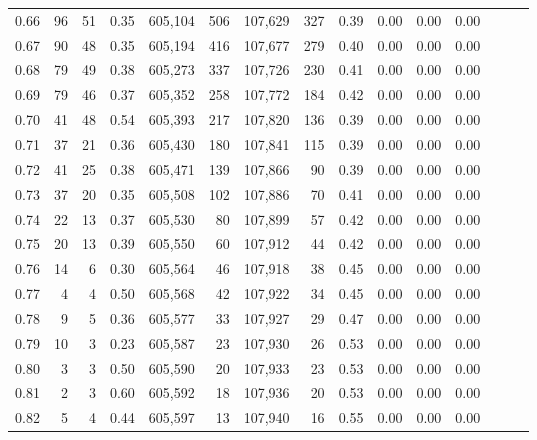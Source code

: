 \begin{tabular}{rrrrrrrrrrrrrrr}
0.66 &      96 &     51 &  0.35 &  605,104 &      506 &  107,629 &      327 &  0.39 &  0.00 &  0.00 &      0.00 \\
0.67 &      90 &     48 &  0.35 &  605,194 &      416 &  107,677 &      279 &  0.40 &  0.00 &  0.00 &      0.00 \\
0.68 &      79 &     49 &  0.38 &  605,273 &      337 &  107,726 &      230 &  0.41 &  0.00 &  0.00 &      0.00 \\
0.69 &      79 &     46 &  0.37 &  605,352 &      258 &  107,772 &      184 &  0.42 &  0.00 &  0.00 &      0.00 \\
0.70 &      41 &     48 &  0.54 &  605,393 &      217 &  107,820 &      136 &  0.39 &  0.00 &  0.00 &      0.00 \\
0.71 &      37 &     21 &  0.36 &  605,430 &      180 &  107,841 &      115 &  0.39 &  0.00 &  0.00 &      0.00 \\
0.72 &      41 &     25 &  0.38 &  605,471 &      139 &  107,866 &       90 &  0.39 &  0.00 &  0.00 &      0.00 \\
0.73 &      37 &     20 &  0.35 &  605,508 &      102 &  107,886 &       70 &  0.41 &  0.00 &  0.00 &      0.00 \\
0.74 &      22 &     13 &  0.37 &  605,530 &       80 &  107,899 &       57 &  0.42 &  0.00 &  0.00 &      0.00 \\
0.75 &      20 &     13 &  0.39 &  605,550 &       60 &  107,912 &       44 &  0.42 &  0.00 &  0.00 &      0.00 \\
0.76 &      14 &      6 &  0.30 &  605,564 &       46 &  107,918 &       38 &  0.45 &  0.00 &  0.00 &      0.00 \\
0.77 &       4 &      4 &  0.50 &  605,568 &       42 &  107,922 &       34 &  0.45 &  0.00 &  0.00 &      0.00 \\
0.78 &       9 &      5 &  0.36 &  605,577 &       33 &  107,927 &       29 &  0.47 &  0.00 &  0.00 &      0.00 \\
0.79 &      10 &      3 &  0.23 &  605,587 &       23 &  107,930 &       26 &  0.53 &  0.00 &  0.00 &      0.00 \\
0.80 &       3 &      3 &  0.50 &  605,590 &       20 &  107,933 &       23 &  0.53 &  0.00 &  0.00 &      0.00 \\
0.81 &       2 &      3 &  0.60 &  605,592 &       18 &  107,936 &       20 &  0.53 &  0.00 &  0.00 &      0.00 \\
0.82 &       5 &      4 &  0.44 &  605,597 &       13 &  107,940 &       16 &  0.55 &  0.00 &  0.00 &      0.00 \\

\end{tabular}

